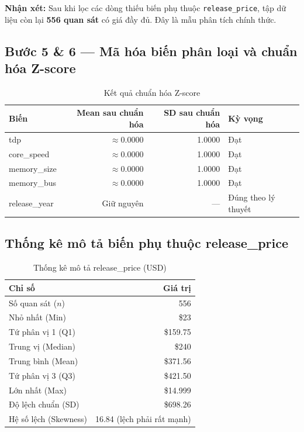 \documentclass[a4paper]{article}
\begin{document}
\textbf{Nhận xét:} Sau khi lọc các dòng thiếu biến phụ thuộc \texttt{release\_price}, tập dữ liệu còn lại \textbf{556 quan sát} có giá đầy đủ. Đây là mẫu phân tích chính thức.

\subsection{Bước 5 \& 6 --- Mã hóa biến phân loại và chuẩn hóa Z-score}

\begin{table}[h!]
\centering
\caption{Kết quả chuẩn hóa Z-score}
\begin{tabular}{|l|r|r|l|}
\hline
\textbf{Biến} & \textbf{Mean sau chuẩn hóa} & \textbf{SD sau chuẩn hóa} & \textbf{Kỳ vọng} \\
\hline
tdp & $\approx 0.0000$ & 1.0000 & Đạt \\
core\_speed & $\approx 0.0000$ & 1.0000 & Đạt \\
memory\_size & $\approx 0.0000$ & 1.0000 & Đạt \\
memory\_bus & $\approx 0.0000$ & 1.0000 & Đạt \\
release\_year & Giữ nguyên & --- & Đúng theo lý thuyết \\
\hline
\end{tabular}
\end{table}

\subsection{Thống kê mô tả biến phụ thuộc release\_price}

\begin{table}[h!]
\centering
\caption{Thống kê mô tả release\_price (USD)}
\begin{tabular}{|l|r|}
\hline
\textbf{Chỉ số} & \textbf{Giá trị} \\
\hline
Số quan sát ($n$) & 556 \\
Nhỏ nhất (Min) & \$23 \\
Tứ phân vị 1 (Q1) & \$159.75 \\
Trung vị (Median) & \$240 \\
Trung bình (Mean) & \$371.56 \\
Tứ phân vị 3 (Q3) & \$421.50 \\
Lớn nhất (Max) & \$14.999 \\
Độ lệch chuẩn (SD) & \$698.26 \\
Hệ số lệch (Skewness) & 16.84 (lệch phải rất mạnh) \\
\hline
\end{tabular}
\end{table}
\end{document}
